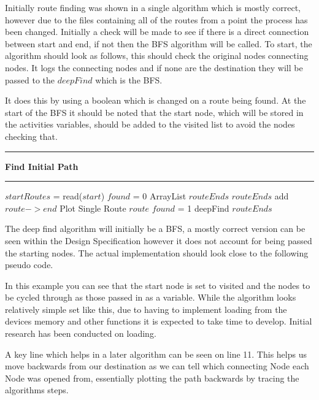 Initially route finding was shown in a single algorithm which is mostly correct, however due to the files containing all of the routes from a point the process has been changed. Initially a check will be made to see if there is a direct connection between start and end, if not then the BFS algorithm will be called. To start, the algorithm should look as follows, this should check the original nodes connecting nodes. It logs the connecting nodes and if none are the destination they will be passed to the $deepFind$ which is the BFS. 

It does this by using a boolean which is changed on a route being found. At the start of the BFS it should be noted that the start node, which will be stored in the activities variables, should be added to the visited list to avoid the nodes checking that. 
\vspace{0.3cm}
\hrule
\vspace{0.1cm}
\textbf{Find Initial Path}
\vspace{0.1cm}
\hrule
\vspace{0.1cm}
\begin{algorithmic}[1]
\State$startRoutes$ = read($start$)
\State $found$ = 0
\State ArrayList $routeEnds$
	\State $routeEnds$ add $route -> end$
		\State Plot Single Route $route$
		\State $found$ = 1
	\EndIf
\EndFor
{}
	\State deepFind $routeEnds$
\EndIf
\end{algorithmic}

The deep find algorithm will initially be a BFS, a mostly correct version can be seen within the Design Specification however it does not account for being passed the starting nodes. The actual implementation should look close to the following pseudo code. 

In this example you can see that the start node is set to visited and the nodes to be cycled through as those passed in as a variable. While the algorithm looks relatively simple set like this, due to having to implement loading from the devices memory and other functions it is expected to take time to develop. Initial research has been conducted on loading. 

A key line which helps in a later algorithm can be seen on line 11. This helps us move backwards from our destination as we can tell which connecting Node each Node was opened from, essentially plotting the path backwards by tracing the algorithms steps. 

